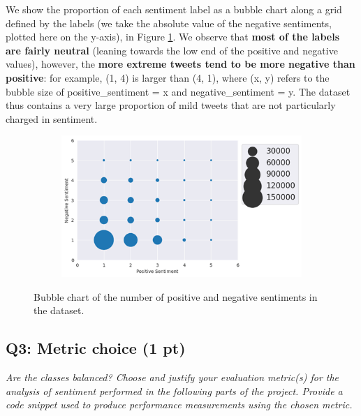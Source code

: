 We show the proportion of each sentiment label as a bubble chart along a grid defined by the labels (we take the absolute value of the negative sentiments, plotted here on the y-axis), in Figure \ref{fig:bubble}. We observe that \textbf{most of the labels are fairly neutral} (leaning towards the low end of the positive and negative values), however, the \textbf{more extreme tweets tend to be more negative than positive}: for example, (1, 4) is larger than (4, 1), where (x, y) refers to the bubble size of positive\_sentiment = x and negative\_sentiment = y. The dataset thus contains a very large proportion of mild tweets that are not particularly charged in sentiment.

\begin{figure}
    \centering
    \begin{subfigure}{0.7\columnwidth}
        \includegraphics[width=1\textwidth]{images/bubble.png}
    \end{subfigure}
    \caption{Bubble chart of the number of positive and negative sentiments in the dataset.}
    \label{fig:bubble}
\end{figure}

\subsection*{Q3: Metric choice (1 pt)}
\textit{Are the classes balanced? Choose and justify your evaluation metric(s) for the analysis of sentiment performed in the following parts of the project. Provide a code snippet used to produce performance measurements using the chosen metric.}

